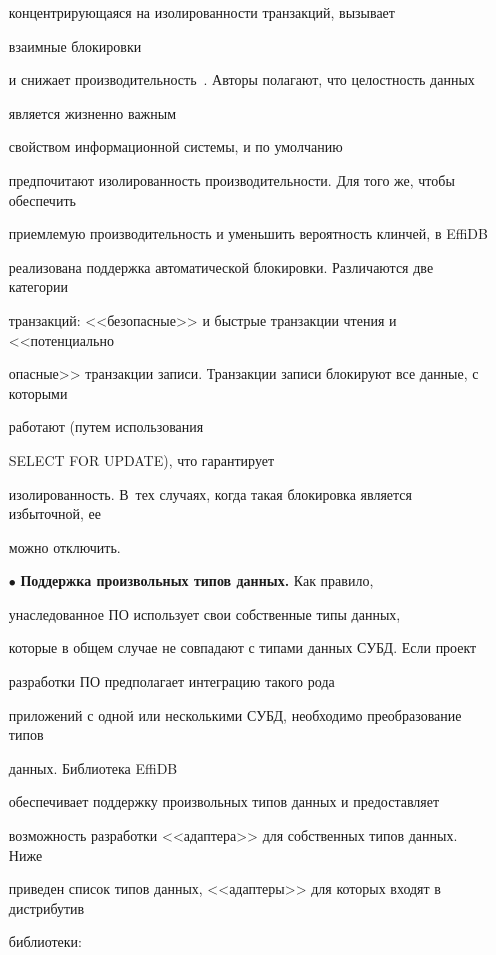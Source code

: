 \begin{multicols}{2}
\begin{itemize}
концентрирующаяся на изолированности транзакций, вызывает\linebreak

 взаимные блокировки 

и снижает производительность~\cite{4-y}. Авторы полагают, что целостность данных 

является жизненно важным\linebreak

 свойством информационной системы, и по умолчанию 

предпочитают изолированность производительности. Для того же, чтобы обеспечить 

приемлемую производительность и уменьшить вероятность клинчей, в EffiDB 

реализована поддержка автоматической блокировки. Различаются две категории 

транзакций: <<безопасные>> и быстрые транзакции чтения и <<потенциально 

опасные>> транзакции записи. Транзакции записи блокируют все данные, с которыми 

работают (путем использования\linebreak

 SELECT FOR UPDATE), что гарантирует 

изолированность. В~тех случаях, когда такая блокировка является избыточной, ее 

можно отключить.

\item[$\bullet$] \textbf{Поддержка произвольных типов данных.} Как правило, 

унаследованное ПО использует свои собственные типы данных, 

которые в общем случае не совпадают с типами данных СУБД. Если проект 

разработки ПО предполагает интеграцию такого рода 

приложений с одной или несколькими СУБД, необходимо преобразование типов 

данных. Библиотека \mbox{EffiDB} 

обеспечивает поддержку произвольных типов данных и пред\-остав\-ля\-ет 

возможность разработки <<адап\-те\-ра>> для собственных типов данных. Ниже 

приведен список типов данных, <<адап\-те\-ры>> для которых входят в дистрибутив 

библиотеки:

\begin{itemize}


\end{itemize}
\end{itemize}
\end{multicols}
